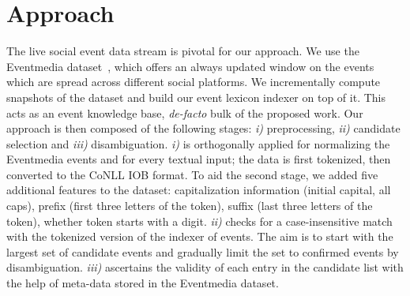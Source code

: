 \documentclass[10pt,a4paper]{article}
\begin{document}
\section{Approach}
The live social event data stream is pivotal for our approach. We use the Eventmedia dataset~\cite{krouf2012}, which offers an always updated window on the events which are spread across different social platforms. We incrementally compute snapshots of the dataset and build our event lexicon indexer on top of it. This acts as an event knowledge base, \textit{de-facto} bulk of the proposed work. Our approach is then composed of the following stages: \textit{i)} preprocessing, \textit{ii)} candidate selection and \textit{iii)} disambiguation. \textit{i)} is orthogonally applied for normalizing the Eventmedia events and for every textual input; the data is first tokenized, then converted to the CoNLL IOB format. To aid the second stage, we added five additional features to the dataset: capitalization information (initial capital, all caps), prefix (first three letters of the token), suffix (last three letters of the token), whether token starts with a digit.
\textit{ii)} checks for a case-insensitive match with the tokenized version of the indexer of events. 
The aim is to start with the largest set of candidate events and gradually limit the set to confirmed events by disambiguation. 
\textit{iii)} ascertains the validity of each entry in the candidate list with the help of meta-data stored in the Eventmedia dataset. 
\end{document}
